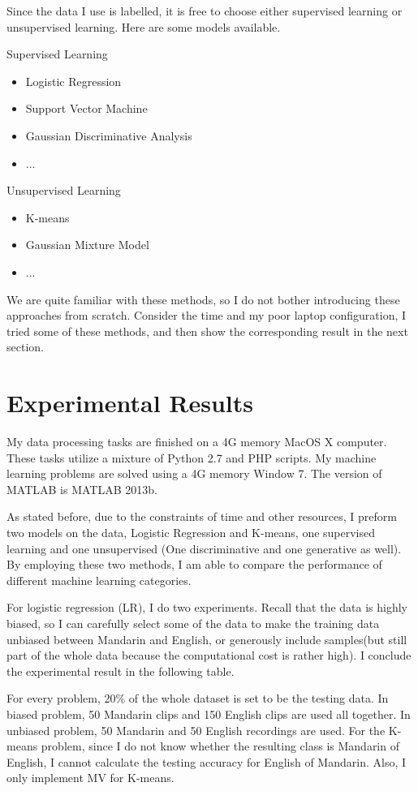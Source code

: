 \documentclass{sig-alternate}
\begin{document}
Since the data I use is labelled, it is free to choose either supervised learning or unsupervised learning. Here are some models available.

Supervised Learning
\begin{itemize}
	\item Logistic Regression
	\item Support Vector Machine
    \item Gaussian Discriminative Analysis
    \item ...
\end{itemize}

Unsupervised Learning
\begin{itemize}
	\item K-means
    \item Gaussian Mixture Model
    \item ...
\end{itemize}

We are quite familiar with these methods, so I do not bother introducing these approaches from scratch. Consider the time and my poor laptop configuration, I tried some of these methods, and then show the corresponding result in the next section.




\section{Experimental Results}
My data processing tasks are finished on a 4G memory MacOS X computer. These tasks utilize a mixture of Python 2.7 and PHP scripts. My machine learning problems are solved using a 4G memory Window 7. The version of MATLAB is MATLAB 2013b.

As stated before, due to the constraints of time and other resources, I preform two models on the data, Logistic Regression and K-means, one supervised learning and one unsupervised (One discriminative and one generative as well). By employing these two methods, I am able to compare the performance of different machine learning categories.

For logistic regression (LR), I do two experiments. Recall that the data is highly biased, so I can carefully select some of the data to make the training data unbiased between Mandarin and English, or generously include samples(but still part of the whole data because the computational cost is rather high). I conclude the experimental result in the following table.

For every problem, 20\% of the whole dataset is set to be the testing data. In biased problem, 50 Mandarin clips and 150 English clips are used all together. In unbiased problem, 50 Mandarin and 50 English recordings are used. For the K-means problem, since I do not know whether the resulting class is Mandarin of English, I cannot calculate the testing accuracy for English of Mandarin. Also, I only implement MV for K-means.
\end{document}
